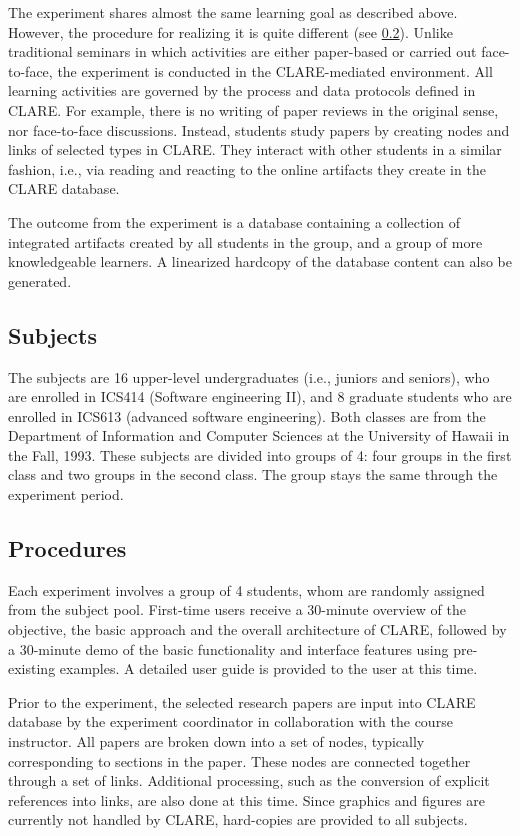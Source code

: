 The experiment shares almost the same learning goal as described above.
However, the procedure for realizing it is quite different (see
\ref{sec:procedures}). Unlike traditional seminars in which activities are
either paper-based or carried out face-to-face, the experiment is conducted
in the CLARE-mediated environment. All learning activities are governed by
the process and data protocols defined in CLARE. For example, there is no
writing of paper reviews in the original sense, nor face-to-face
discussions. Instead, students study papers by creating nodes and links of
selected types in CLARE. They interact with other students in a similar
fashion, i.e., via reading and reacting to the online artifacts they create
in the CLARE database.

The outcome from the experiment is a database containing a collection of
integrated artifacts created by all students in the group, and a group of
more knowledgeable learners. A linearized hardcopy of the database content
can also be generated.


\subsection{Subjects}

The subjects are 16 upper-level undergraduates (i.e., juniors and
seniors), who are enrolled in ICS414 (Software engineering II), and
8 graduate students who are enrolled in ICS613 (advanced software
engineering). Both classes are from the Department of Information
and Computer Sciences at the University of Hawaii in the Fall,
1993. These subjects are divided into groups of 4: four groups in
the first class and two groups in the second class.  The group
stays the same through the experiment period.


\subsection{Procedures}
\label{sec:procedures}

Each experiment involves a group of 4 students, whom are randomly assigned
from the subject pool. First-time users receive a 30-minute overview of the
objective, the basic approach and the overall architecture of CLARE,
followed by a 30-minute demo of the basic functionality and interface
features using pre-existing examples. A detailed user guide is provided to
the user at this time.

Prior to the experiment, the selected research papers are input into CLARE
database by the experiment coordinator in collaboration with the course
instructor. All papers are broken down into a set of nodes, typically
corresponding to sections in the paper. These nodes are connected together
through a set of links. Additional processing, such as the conversion of
explicit references into links, are also done at this time.  Since graphics
and figures are currently not handled by CLARE, hard-copies are provided to
all subjects.

